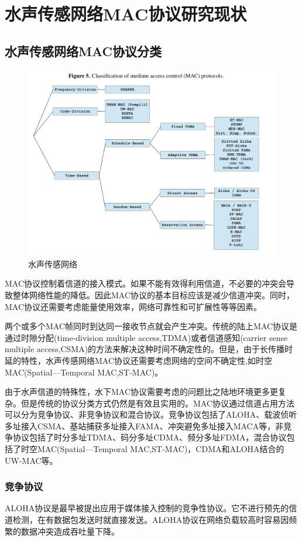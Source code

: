 \chapter{水声传感网络MAC协议研究现状 }
\section{水声传感网络MAC协议分类}
\begin{figure}[ht]
	\centering
	\includegraphics[scale=0.2]{figures/cha.png}
	\caption{
		水声传感网络
	}
	\label{fig:example}
\end{figure}
MAC协议控制着信道的接入模式。如果不能有效得利用信道，不必要的冲突会导致整体网络性能的降低。因此MAC协议的基本目标应该是减少信道冲突。同时，MAC协议还需要考虑能量使用效率，网络可靠性和可扩展性等等因素。

两个或多个MAC帧同时到达同一接收节点就会产生冲突。传统的陆上MAC协议是通过时隙分配(time-division multiple access,TDMA)或者信道感知(carrier
sense multiple access,CSMA)的方法来解决这种时间不确定性的。但是，由于长传播时延的特性，水声传感网络MAC协议还需要考虑网络的空间不确定性,如时空MAC(Spatial—Temporal MAC,ST-MAC)。

由于水声信道的特殊性，水下MAC协议需要考虑的问题比之陆地环境更多更复杂。但是传统的协议分类方式仍然是有效且实用的。MAC协议通过信道占用方法可以分为竞争协议、非竞争协议和混合协议。竞争协议包括了ALOHA、载波侦听多址接入CSMA、基站捕获多址接入FAMA、冲突避免多址接入MACA等，非竞争协议包括了时分多址TDMA、码分多址CDMA、频分多址FDMA，混合协议包括了时空MAC(Spatial—Temporal MAC,ST-MAC)，CDMA和ALOHA结合的UW-MAC等。
\subsection{竞争协议}
ALOHA协议是最早被提出应用于媒体接入控制的竞争性协议。它不进行预先的信道检测，在有数据包发送时就直接发送。ALOHA协议在网络负载较高时容易因频繁的数据冲突造成吞吐量下降。

